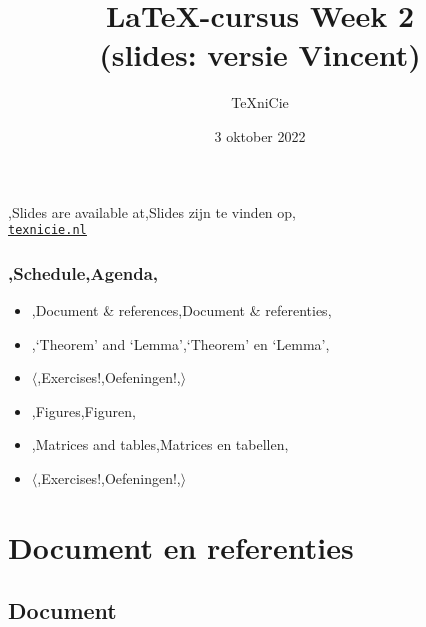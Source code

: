 \documentclass[
    dutch,
    everyoneauthor=true,
    defaultSlideCollection=vincent,
    slidenames=true
]{../../cursuspresentatie}
\title[\LaTeX{}-cursus Week 2]{\LaTeX{}-cursus Week 2\\(slides: versie Vincent)}
\author{\TeX niCie}
\date{3 oktober 2022}
\begin{document}

\begin{frame}
    \titlepage
    \centering

    {\Large\lang,Slides are available at,Slides zijn te vinden op,\\
    \href{https://texnicie.nl}{\ul{\texttt{texnicie.nl}}}}
\end{frame}

\setul{1pt}{2pt}

\begin{frame}
    \frametitle{\lang,Schedule,Agenda,}
    
    \begin{itemize}
        \item \lang,Document \& references,Document \& referenties,
        \item \lang,`Theorem' and `Lemma',`Theorem' en `Lemma',
        \item $ \langle $\lang,Exercises!,Oefeningen!,$ \rangle $
        \item \lang,Figures,Figuren,
        \item \lang,Matrices and tables,Matrices en tabellen,
        \item $ \langle $\lang,Exercises!,Oefeningen!,$ \rangle $
    \end{itemize}
\end{frame}

\section{Document en referenties}

\subsection{Document}
\end{document}
